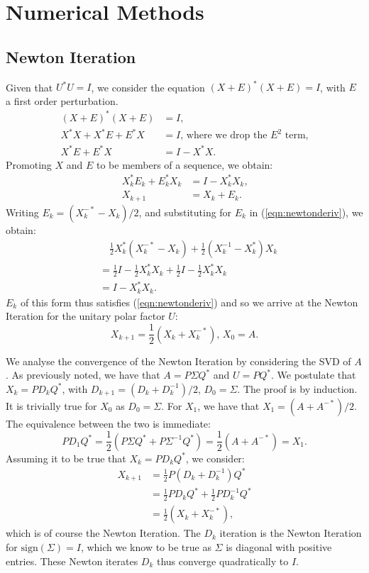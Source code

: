 \documentclass[12pt]{article}
\begin{document}
\section{Numerical Methods}
\subsection{Newton Iteration}
Given that $U^*U = I$, we consider the equation $(X+E)^*(X+E) = I$, with $E$ a
first order perturbation.
\begin{align*}
  (X+E)^*(X+E) & = I\text{, } \\
  X^*X + X^*E + E^*X & = I\text{, where we drop the } E^2 \text{ term,} \\
  X^*E + E^*X &  = I - X^*X\text{.} 
\end{align*}
Promoting $X$ and $E$ to be members of a sequence, we obtain:
\begin{align}\label{eqn:newtonderiv}
    X_k^*E_k + E_k^*X_k & = I - X_k^*X_k\text{,} \\
    X_{k+1} & = X_k + E_k\text{.}
\end{align}
Writing $E_k = (X_k^{-*} - X_k)/2$, and substituting for
$E_k$ in (\ref{eqn:newtonderiv}), we obtain:
\begin{align*}
  &\quad\frac{1}{2}X_k^*(X_k^{-*} - X_k) + \frac{1}{2}(X_k^{-1} - X_k^*)X_k \\
  &= \frac{1}{2}I - \frac{1}{2} X_k^*X_k + \frac{1}{2}I -  \frac{1}{2} X_k^*X_k  \\
  &= I - X_k^*X_k\text{.}
\end{align*}
$E_k$ of this form thus satisfies (\ref{eqn:newtonderiv}) and so we arrive
at the Newton Iteration for the unitary polar factor $U$:
\begin{equation}\label{eqn:newton}
  X_{k+1} = \frac{1}{2}(X_k + X_{k}^{-*})\text{, } X_0 = A\text{.}
\end{equation}

We analyse the convergence of the Newton Iteration by considering the SVD of $A$.
As previously noted, we have that $A=P\Sigma Q^*$ and $U=PQ^*$.
We postulate that $X_k = PD_kQ^*$, with $D_{k+1} = (D_k + D_k^{-1})/2$, $D_0 = \Sigma$.
The proof is by induction.
It is trivially true for $X_0$ as $D_0 = \Sigma$.
For $X_1$, we have that $X_1 = (A + A^{-*})/2$.
The equivalence between the two is immediate:
\begin{equation*}
  PD_1Q^* = \frac{1}{2}(P\Sigma Q^* + P\Sigma^{-1} Q^*) = \frac{1}{2}(A + A^{-*}) = X_1\text{.}
\end{equation*}
Assuming it to be true that $X_k = PD_kQ^*$, we consider:
\begin{align*}
  X_{k+1} & = \frac{1}{2}P(D_k + D_k^{-1})Q^* \\
          & = \frac{1}{2}PD_kQ^* + \frac{1}{2}PD_k^{-1}Q^* \\
          & = \frac{1}{2}(X_k + X_k^{-*})\text{, }
\end{align*}
which is of course the Newton Iteration. The $D_k$ iteration is the Newton
Iteration for $\mathrm{sign}(\Sigma) = I$, which we know to be true as $\Sigma$
is diagonal with positive entries. These Newton iterates $D_k$ thus converge
quadratically to $I$\cite[p.~113]{Higham:2008:FM}.
\end{document}
